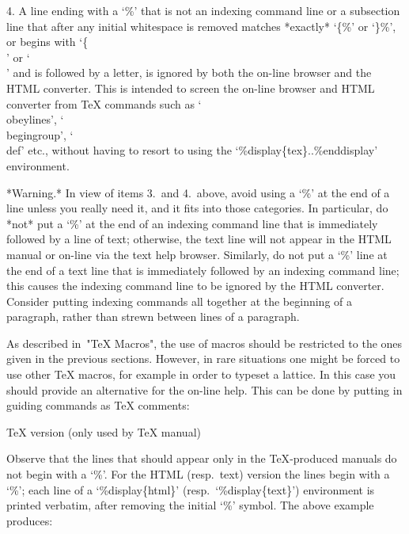 \item{4.}
A line ending with a `\%' that is not  an  indexing  command  line  or  a
subsection line that after any  initial  whitespace  is  removed  matches
*exactly* `\{\%' or `\}\%', or begins with `\{\\' or `\\' and is followed
by a letter, is  ignored  by  both  the  on-line  browser  and  the  HTML
converter. This is intended  to  screen  the  on-line  browser  and  HTML
converter from {\TeX} commands  such  as  `\\obeylines',  `\\begingroup',
`\\def'   etc.,   without    having    to    resort    to    using    the
`\%display\{tex\}..\%enddisplay' environment.

\endlist

*Warning.* In view of items 3.~and 4.~above, avoid using a  `\%'  at  the
end of a line  unless  you  really  need  it,  and  it  fits  into  those
categories. In particular, do *not* put a `\%' at the end of an  indexing
command line that is immediately followed by a line of  text;  otherwise,
the text line will not appear in the HTML manual or on-line via the  text
help browser. Similarly, do not put a `\%' line at the end of a text line
that is immediately followed by an indexing command line; this causes the
indexing command line to be  ignored  by  the  HTML  converter.  Consider
putting indexing commands all together at the beginning of  a  paragraph,
rather than strewn between lines of a paragraph.


As described in~"TeX Macros", the use of macros should be  restricted  to
the ones given in the previous sections. However, in rare situations  one
might be forced to use other {\TeX}  macros,  for  example  in  order  to
typeset a lattice. In this case you should provide an alternative for the
on-line help. This can be done by putting in guiding commands  as  {\TeX}
comments:

\begintt
TeX version (only used by TeX manual)
\endtt

Observe that the lines that should appear  only  in  the  {\TeX}-produced
manuals do not begin with a `\%'. For the HTML (resp.~text)  version  the
lines  begin  with  a  `\%';   each   line   of   a   `\%display\{html\}'
(resp.~`\%display\{text\}')  environment  is  printed   verbatim,   after
removing the initial `\%' symbol. The above example produces:

